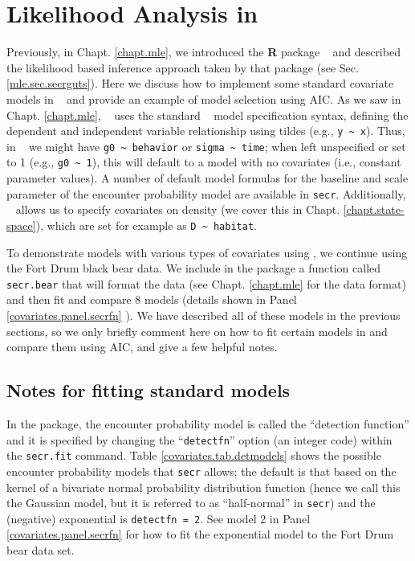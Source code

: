 \section{Likelihood Analysis in \secr}
\label{likelihood.secr}

Previously, in Chapt. \ref{chapt.mle}, we introduced the {\bf R}
package \secr~ and described the likelihood based inference approach taken
by that package (see Sec. \ref{mle.sec.secrguts}).  Here we discuss how
to implement some standard covariate models in \secr~ and provide an
example of model selection using AIC.   As we saw in
Chapt. \ref{chapt.mle}, \secr~ uses the standard \R~ model
specification syntax, defining the dependent and independent
variable relationship using tildes (e.g., \Verb+y ~ x+).  Thus, in
\secr~ we might have \verb+g0 ~ behavior+ or
\verb+sigma ~ time+; when left unspecified or set to 1 (e.g.,
\verb+g0 ~ 1+), this will default to a model with no covariates (i.e.,
constant parameter values).  A number of default model formulas for
the baseline and scale parameter of the encounter probability model
are available in \mbox{\tt secr}.
Additionally, \secr~ allows us to specify
covariates on density (we cover this in
Chapt. \ref{chapt.state-space}), which are set for
example as \verb+D ~ habitat+.

To demonstrate
 models with various types of covariates using \secr, we
continue using the Fort Drum black bear data. 
We include in the \scrbook package a function called {\tt secr.bear}
that will format the data (see Chapt. \ref{chapt.mle} for the \secr
data format) and then fit and compare 8 models (details shown in Panel
\ref{covariates.panel.secrfn} ).  We have described all of these
models in the previous sections, so we only briefly comment here on
how to fit certain models in \secr and compare them using AIC, and
give a few helpful notes.

\subsection{Notes for fitting standard models}

In the \secr package, the encounter probability model is called the
``detection function'' and it is specified 
by changing the ``\mbox{\tt detectfn}'' option (an integer code)
within the \mbox{\tt secr.fit} command.  Table
\ref{covariates.tab.detmodels} shows the possible encounter
probability models 
that \mbox{\tt secr} allows; the default is that based on the kernel
of a bivariate normal probability distribution function
(hence we call this the Gaussian model, but it is referred to as
``half-normal'' 
in \mbox{\tt secr}) and the
(negative) exponential is \mbox{\tt detectfn = 2}.  See model 2 in 
Panel \ref{covariates.panel.secrfn} for how to fit the exponential 
model to the Fort Drum bear data set. 


